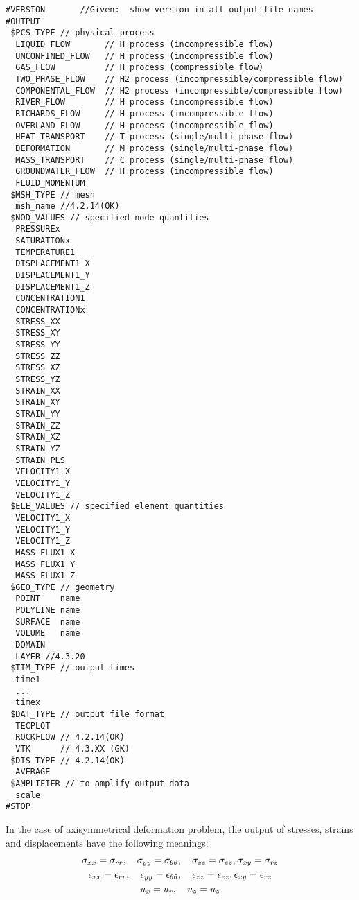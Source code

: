 \begin{verbatim}
#VERSION       //Given:  show version in all output file names
#OUTPUT
 $PCS_TYPE // physical process
  LIQUID_FLOW       // H process (incompressible flow)
  UNCONFINED_FLOW   // H process (incompressible flow)
  GAS_FLOW          // H process (compressible flow)
  TWO_PHASE_FLOW    // H2 process (incompressible/compressible flow)
  COMPONENTAL_FLOW  // H2 process (incompressible/compressible flow)
  RIVER_FLOW        // H process (incompressible flow)
  RICHARDS_FLOW     // H process (incompressible flow)
  OVERLAND_FLOW     // H process (incompressible flow)
  HEAT_TRANSPORT    // T process (single/multi-phase flow)
  DEFORMATION       // M process (single/multi-phase flow)
  MASS_TRANSPORT    // C process (single/multi-phase flow)
  GROUNDWATER_FLOW  // H process (incompressible flow)
  FLUID_MOMENTUM
 $MSH_TYPE // mesh
  msh_name //4.2.14(OK)
 $NOD_VALUES // specified node quantities
  PRESSUREx
  SATURATIONx
  TEMPERATURE1
  DISPLACEMENT1_X
  DISPLACEMENT1_Y
  DISPLACEMENT1_Z
  CONCENTRATION1
  CONCENTRATIONx
  STRESS_XX
  STRESS_XY
  STRESS_YY
  STRESS_ZZ
  STRESS_XZ
  STRESS_YZ
  STRAIN_XX
  STRAIN_XY
  STRAIN_YY
  STRAIN_ZZ
  STRAIN_XZ
  STRAIN_YZ
  STRAIN_PLS
  VELOCITY1_X
  VELOCITY1_Y
  VELOCITY1_Z
 $ELE_VALUES // specified element quantities
  VELOCITY1_X
  VELOCITY1_Y
  VELOCITY1_Z
  MASS_FLUX1_X
  MASS_FLUX1_Y
  MASS_FLUX1_Z
 $GEO_TYPE // geometry
  POINT    name
  POLYLINE name
  SURFACE  name
  VOLUME   name
  DOMAIN
  LAYER //4.3.20
 $TIM_TYPE // output times
  time1
  ...
  timex
 $DAT_TYPE // output file format
  TECPLOT
  ROCKFLOW // 4.2.14(OK)
  VTK      // 4.3.XX (GK)
 $DIS_TYPE // 4.2.14(OK)
  AVERAGE
 $AMPLIFIER // to amplify output data
  scale
#STOP
\end{verbatim}

In the case of  axisymmetrical deformation problem, the output of
stresses, strains and displacements have the following meanings:
\begin{gather}
   \sigma_{xx}=\sigma_{rr}, \quad  \sigma_{yy}=\sigma_{\theta\theta},\quad
  \sigma_{zz}=\sigma_{zz}, \sigma_{xy}=\sigma_{rz} \nonumber\\
   \epsilon_{xx}=\epsilon_{rr}, \quad  \epsilon_{yy}=\epsilon_{\theta\theta},\quad
  \epsilon_{zz}=\epsilon_{zz}, \epsilon_{xy}=\epsilon_{rz} \nonumber\\
  u_{x}=u_{r},\quad u_z=u_z \nonumber
\end{gather}

